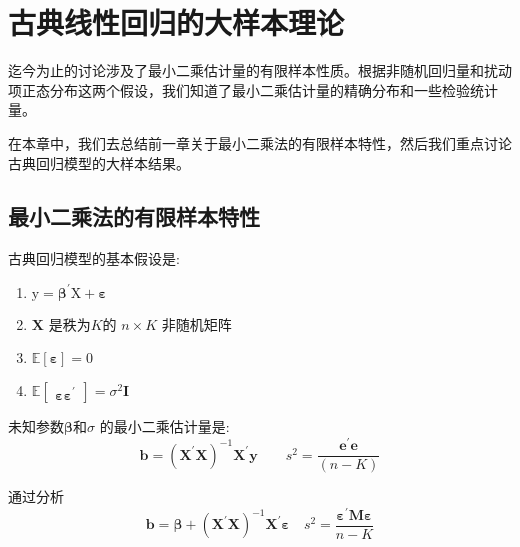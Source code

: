 
\chapter{古典线性回归的大样本理论}

迄今为止的讨论涉及了最小二乘估计量的有限样本性质。根据非随机回归量和扰动项正态分布这两个假设，我们知道了最小二乘估计量的精确分布和一些检验统计量。

在本章中，我们去总结前一章关于最小二乘法的有限样本特性，然后我们重点讨论古典回归模型的大样本结果。

\section{最小二乘法的有限样本特性}
古典回归模型的基本假设是:
\begin{enumerate}[I]
    \item $ \boldsymbol{ \mathrm{y}= \beta^{ \prime }\mathrm{X} +\varepsilon } $
    \item $  \boldsymbol{ X } $ 是秩为$ K $的 $n \times K$ 非随机矩阵
    \item $ \mathbb{E} \left[  \boldsymbol{\varepsilon} \right]=0 $
    \item $\mathbb{E} \left[\begin{array}{ll}
        \boldsymbol{ \varepsilon  \varepsilon^{\prime} }
        \end{array}\right]=\sigma^{2} \mathrm{ \boldsymbol{I} }$
\end{enumerate}

未知参数$  \boldsymbol{\beta} $和$ \sigma $ 的最小二乘估计量是:
$$  \boldsymbol{b} = \left(  \boldsymbol{X^{\prime} X} \right)^{-1}  \boldsymbol{X^{\prime} y}  \qquad s^{2}=\frac{ \boldsymbol{e^{\prime} e}}{(n-K)} $$

通过分析 
$$  \boldsymbol{b} =  \boldsymbol{\beta} +
            \left(  \boldsymbol{X^{\prime} X} \right)^{-1}  \boldsymbol{X^{\prime} \varepsilon}  \quad  s^{2}
            = \frac{ \boldsymbol{\varepsilon^{\prime} M \varepsilon}}{n-K} $$

